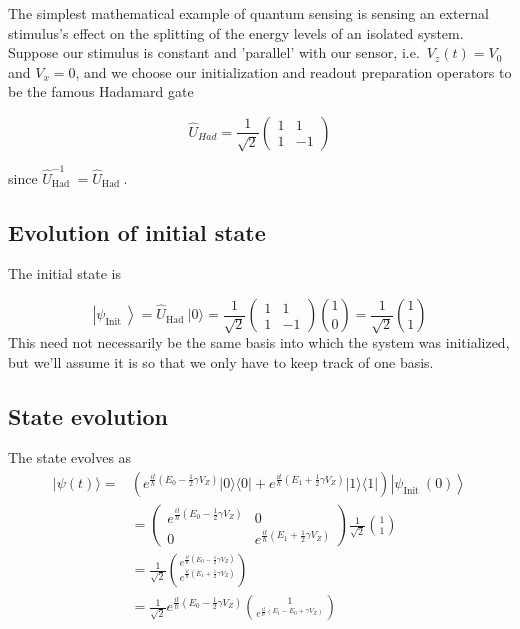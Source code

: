 \documentclass[%
oneside,                 %
final,                   %
10pt]{article}
\begin{document}
The simplest mathematical example of quantum sensing is sensing an
external stimulus's effect on the splitting of the energy levels of an
isolated system. Suppose our stimulus is constant and 'parallel' with
our sensor, i.e.~$V_z(t)=V_{0}$ and $V_x=0$, and we choose
our initialization and readout preparation operators to be the famous
Hadamard gate

\[
\hat{U}_{H a d}=\frac{1}{\sqrt{2}}\left(\begin{array}{cc}
1 & 1 \\
1 & -1
\end{array}\right)
\]

since $\hat{U}_{\text {Had }}^{-1}=\hat{U}_{\text {Had }}$.\\

\subsection{Evolution of initial state}

The initial state is 

\[
\left|\psi_{\text {Init }}\right\rangle=\hat{U}_{\text {Had }}|0\rangle=\frac{1}{\sqrt{2}}\left(\begin{array}{cc}
1 & 1 \\
1 & -1
\end{array}\right)\binom{1}{0}=\frac{1}{\sqrt{2}}\binom{1}{1}
\]
This need not necessarily be the same basis into which the system was initialized, but we'll assume it is so that we only have to keep track of one basis.

\subsection{State evolution}

The state evolves as
\begin{align*}
|\psi(t)\rangle=&\left(e^{\frac{i t}{\hbar}\left(E_{0}-\frac{1}{2} \gamma V_Z\right)}|0\rangle\langle 0|+e^{\frac{i t}{\hbar}\left(E_{1}+\frac{1}{2} \gamma V_Z\right)}|1\rangle\langle 1|\right)\left|\psi_{\text {Init }}(0)\right\rangle\\
&=\left(\begin{array}{cc}
e^{\frac{i t}{\hbar}\left(E_{0}-\frac{1}{2} \gamma V_Z\right)} & 0 \\
0 & e^{\frac{i t}{\hbar}\left(E_{1}+\frac{1}{2} \gamma V_Z\right)}
\end{array}\right) \frac{1}{\sqrt{2}}\binom{1}{1} \\
& =\frac{1}{\sqrt{2}}\binom{e^{\frac{i t}{\hbar}\left(E_{0}-\frac{1}{2} \gamma V_Z\right)}}{e^{\frac{i t}{\hbar}\left(E_{1}+\frac{1}{2} \gamma V_Z\right)}}\\
&=\frac{1}{\sqrt{2}} e^{\frac{i t}{\hbar}\left(E_{0}-\frac{1}{2} \gamma V_Z\right)}\binom{1}{e^{\frac{i t}{\hbar}\left(E_{1}-E_{0}+\gamma V_Z\right)}}
\end{align*}
\end{document}
